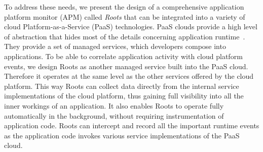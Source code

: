 To address these needs, we present the design of  a comprehensive application platform 
monitor (APM) called \textit{Roots} that can be integrated
into a variety of cloud Platform-as-a-Service (PaaS) technologies. 
PaaS clouds provide a high level of abstraction that hides most of the details concerning application
runtime~\cite{Soni:2014:CCB:2592737.2592741}. They provide a set of managed services, which developers compose into applications.
To be able to correlate application activity with cloud platform events,
we design Roots as another managed service built into the PaaS cloud. Therefore
it operates at the same level as the other services offered by the cloud platform. This way Roots can collect data
directly from the internal service implementations of the cloud platform, thus gaining full visibility into all the 
inner workings of an application. It also enables Roots to operate fully automatically in the background, without
requiring instrumentation of application code. Roots can intercept and record all the important runtime events as the
application code invokes various service implementations of the PaaS cloud.



